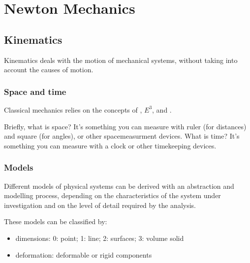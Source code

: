 \documentclass[letterpaper,10pt,english]{jupyterBook}
\begin{document}
\part{Newton Mechanics}

\sphinxstepscope


\chapter{Kinematics}
\label{\detokenize{ch/kinematics:kinematics}}\label{\detokenize{ch/kinematics:classical-mechanics-kinematics}}\label{\detokenize{ch/kinematics::doc}}
\sphinxAtStartPar
Kinematics deals with the motion of mechanical systems, without taking into account the causes of motion.


\section{Space and time}
\label{\detokenize{ch/kinematics:space-and-time}}\label{\detokenize{ch/kinematics:classical-mechanics-kinematics-space-time}}
\sphinxAtStartPar
Classical mechanics relies on the concepts of , \(E^3\), and .

\sphinxAtStartPar
Briefly, what is space? It’s something you can measure with ruler (for distances) and square (for angles), or other space\sphinxhyphen{}measurment devices.
What is time? It’s something you can measure with a clock or other timekeeping devices.


\section{Models}
\label{\detokenize{ch/kinematics:models}}\label{\detokenize{ch/kinematics:classical-mechanics-kinematics-models}}
\sphinxAtStartPar
Different models of physical systems can be derived with an abstraction and modelling process, depending on the characteristics of the system under investigation and on the level of detail required by the analysis.

\sphinxAtStartPar
These models can be classified by:
\begin{itemize}
\item {} 
\sphinxAtStartPar
dimensions: 0: point; 1: line; 2: surfaces; 3: volume solid

\item {} 
\sphinxAtStartPar
deformation: deformable or rigid components

\end{itemize}
\end{document}
